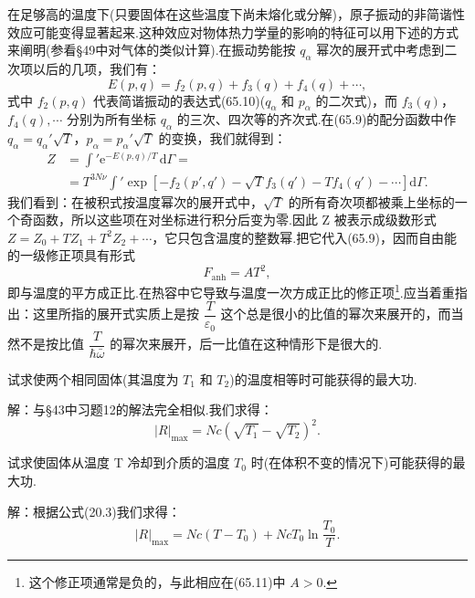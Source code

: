在足够高的温度下(只要固体在这些温度下尚未熔化或分解)，原子振动的非简谐性效应可能变得显著起来.这种效应对物体热力学量的影响的特征可以用下述的方式来阐明(参看§49中对气体的类似计算).在振动势能按 $q_\alpha$ 幂次的展开式中考虑到二次项以后的几项，我们有：
\begin{equation*}
  E(p,q)=f_2(p,q)+f_3(q)+f_4(q)+\cdots,
\end{equation*}
式中 $f_2(p,q)$ 代表简谐振动的表达式(65.10)($q_\alpha$ 和 $p_\alpha$ 的二次式)，而 $f_3(q)$，$f_4(q),\cdots$ 分别为所有坐标 $q_\alpha$ 的三次、四次等的齐次式.在(65.9)的配分函数中作 $q_\alpha=q_\alpha'\sqrt{T}$，$p_\alpha=p_\alpha'\sqrt{T}$ 的变换，我们就得到：
\begin{equation*}
\begin{aligned}
  Z&=\int'\mathrm{e}^{-E(p,q)/T}\,\mathrm{d}\varGamma=\\
  &=T^{3N\nu}\int'\exp\left[-f_2(p',q')-\sqrt{T}f_3(q')-Tf_4(q')-\cdots\right]\mathrm{d}\varGamma.
\end{aligned}
\end{equation*}
我们看到：在被积式按温度幂次的展开式中，$\sqrt{T}$ 的所有奇次项都被乘上坐标的一个奇函数，所以这些项在对坐标进行积分后变为零.因此 Z 被表示成级数形式 $Z=Z_0+TZ_1+T^2Z_2+\cdots$，它只包含温度的整数幂.把它代入(65.9)，因而自由能的一级修正项具有形式
\begin{equation}
  F_{\mathrm{anh}}=AT^2,
\end{equation}
即与温度的平方成正比.在热容中它导致与温度一次方成正比的修正项\footnote{这个修正项通常是负的，与此相应在(65.11)中 $A>0$.}.应当着重指出：这里所指的展开式实质上是按 $\dfrac{T}{\varepsilon_0}$ 这个总是很小的比值的幂次来展开的，而当然不是按比值 $\dfrac{T}{\hbar\bar{\omega}}$ 的幂次来展开，后一比值在这种情形下是很大的.

\begin{xiti}

\quad 试求使两个相同固体(其温度为 $T_1$ 和 $T_2$)的温度相等时可能获得的最大功.

解：与§43中习题12的解法完全相似.我们求得：
\begin{equation*}
  |R|_{\max}=Nc\left(\sqrt{T_1}-\sqrt{T_2}\right)^2.
\end{equation*}

\quad 试求使固体从温度 T 冷却到介质的温度 $T_0$ 时(在体积不变的情况下)可能获得的最大功.

解：根据公式(20.3)我们求得：
\begin{equation*}
  |R|_{\max}=Nc\left(T-T_0\right)+NcT_0\ln\frac{T_0}{T}.
\end{equation*}

\end{xiti}

